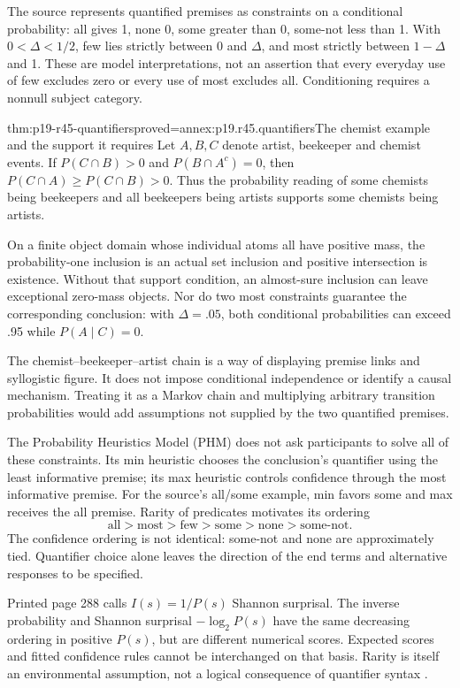 The source represents quantified premises as constraints on a
conditional probability: all gives 1, none 0, some greater than 0,
some-not less than 1. With \(0<\Delta<1/2\), few lies strictly
between 0 and \(\Delta\), and most strictly between
\(1-\Delta\) and 1. These are model interpretations, not an assertion
that every everyday use of few excludes zero or every use of most
excludes all. Conditioning requires a nonnull subject category.

\begin{hbtheorem}{thm:p19-r45-quantifiers}{proved=annex:p19.r45.quantifiers}{The chemist example and the support it requires}
Let \(A,B,C\) denote artist, beekeeper and chemist events.
If \(P(C\cap B)>0\) and \(P(B\cap A^c)=0\), then
\(P(C\cap A)\geq P(C\cap B)>0\). Thus the probability reading
of some chemists being beekeepers and all beekeepers being artists
supports some chemists being artists.

On a finite object domain whose individual atoms all have positive
mass, the probability-one inclusion is an actual set inclusion and
positive intersection is existence. Without that support condition,
an almost-sure inclusion can leave exceptional zero-mass objects.
Nor do two most constraints guarantee the corresponding conclusion:
with \(\Delta=.05\), both conditional probabilities can exceed .95
while \(P(A\mid C)=0\).
\end{hbtheorem}

The chemist--beekeeper--artist chain is a way of displaying premise
links and syllogistic figure. It does not impose conditional
independence or identify a causal mechanism. Treating it as a Markov
chain and multiplying arbitrary transition probabilities would add
assumptions not supplied by the two quantified premises.

The Probability Heuristics Model (PHM) does not ask participants to
solve all of these constraints. Its min heuristic chooses the
conclusion's quantifier using the least informative premise; its max
heuristic controls confidence through the most informative premise.
For the source's all/some example, min favors some and max receives
the all premise. Rarity of predicates motivates its ordering
\[
 \text{all}>\text{most}>\text{few}>\text{some}>\text{none}>\text{some-not}.
\]
The confidence ordering is not identical: some-not and none are
approximately tied. Quantifier choice alone leaves the direction of
the end terms and alternative responses to be specified.

Printed page 288 calls \(I(s)=1/P(s)\) Shannon surprisal. The
inverse probability and Shannon surprisal \(-\log_2 P(s)\) have
the same decreasing ordering in positive \(P(s)\), but are different
numerical scores. Expected scores and fitted confidence rules cannot
be interchanged on that basis. Rarity is itself an environmental
assumption, not a logical consequence of quantifier syntax
\cite[p.~288]{ChaterOaksford2021BayesianReasoning}.

